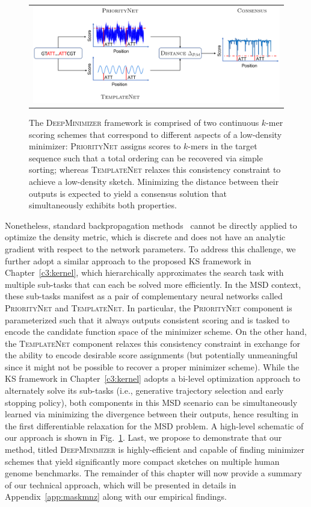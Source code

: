 \begin{figure}[ht]
\centering
\begin{tabular}{c}
\includegraphics[width=0.95\columnwidth]{minimizer_plots/Schematic.png} 
\end{tabular}
\caption{The \textsc{DeepMinimizer} framework is comprised of two continuous $k$-mer scoring schemes that correspond to different aspects of a low-density minimizer: \textsc{PriorityNet} assigns scores to $k$-mers in the target sequence such that a total ordering can be recovered via simple sorting; whereas \textsc{TemplateNet} relaxes this consistency constraint to achieve a low-density sketch. Minimizing the distance between their outputs is expected to yield a consensus solution that simultaneously exhibits both properties.}
\label{c5-fig:prioritynet}
\end{figure}
Nonetheless, standard backpropagation methods~\citep{kingma14adam} cannot be directly applied to optimize the density metric, which is discrete and does not have an analytic gradient with respect to the network parameters. To address this challenge, we further adopt a similar approach to the proposed KS framework in Chapter~\ref{c3:kernel}, which hierarchically approximates the search task with multiple sub-tasks that can each be solved more efficiently. In the MSD context, these sub-tasks manifest as a pair of complementary neural networks called \textsc{PriorityNet} and \textsc{TemplateNet}. In particular, the \textsc{PriorityNet} component is parameterized such that it always outputs consistent scoring and is tasked to encode the candidate function space of the minimizer scheme. On the other hand, the \textsc{TemplateNet} component relaxes this consistency constraint in exchange for the ability to encode desirable score assignments (but potentially unmeaningful since it might not be possible to recover a proper minimizer scheme). While the KS framework in Chapter~\ref{c3:kernel} adopts a bi-level optimization approach to alternately solve its sub-tasks (i.e., generative trajectory selection and early stopping policy), both components in this MSD scenario can be simultaneously learned via minimizing the divergence between their outputs, hence resulting in the first differentiable relaxation for the MSD problem. A high-level schematic of our approach is shown in Fig.~\ref{c5-fig:prioritynet}. Last, we propose to demonstrate that our method, titled \textsc{DeepMinimizer} is highly-efficient and capable of finding minimizer schemes that yield significantly more compact sketches on multiple human genome benchmarks. The remainder of this chapter will now provide a summary of our technical approach, which will be presented in details in Appendix~\ref{app:maskmnz} along with our empirical findings.

